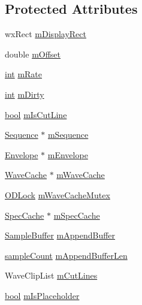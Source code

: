 \subsection*{Protected Attributes}
\begin{DoxyCompactItemize}
\item 
wx\+Rect \hyperlink{class_wave_clip_a53b40f71993f40e4753bfd37a0cd9f9d}{m\+Display\+Rect}
\item 
double \hyperlink{class_wave_clip_ab050845a8220c996af5e8b298e8b2b68}{m\+Offset}
\item 
\hyperlink{xmltok_8h_a5a0d4a5641ce434f1d23533f2b2e6653}{int} \hyperlink{class_wave_clip_a4862030d149b9990fb10891c79953f9e}{m\+Rate}
\item 
\hyperlink{xmltok_8h_a5a0d4a5641ce434f1d23533f2b2e6653}{int} \hyperlink{class_wave_clip_a0e1da41c713ec104dbb33886d2370643}{m\+Dirty}
\item 
\hyperlink{mac_2config_2i386_2lib-src_2libsoxr_2soxr-config_8h_abb452686968e48b67397da5f97445f5b}{bool} \hyperlink{class_wave_clip_a8a0aade8437f6e7400f85b85da659ae5}{m\+Is\+Cut\+Line}
\item 
\hyperlink{class_sequence}{Sequence} $\ast$ \hyperlink{class_wave_clip_a1aab29e1271276ad00a3db2222da37db}{m\+Sequence}
\item 
\hyperlink{class_envelope}{Envelope} $\ast$ \hyperlink{class_wave_clip_a3633c7bbd9fc7f3a9f7cc538b4904e1e}{m\+Envelope}
\item 
\hyperlink{class_wave_cache}{Wave\+Cache} $\ast$ \hyperlink{class_wave_clip_a9ab0ebef5a8cf26be2cac1fdc5fdaea9}{m\+Wave\+Cache}
\item 
\hyperlink{class_o_d_lock}{O\+D\+Lock} \hyperlink{class_wave_clip_ace99287e9c907db79cecfe223f27d470}{m\+Wave\+Cache\+Mutex}
\item 
\hyperlink{class_spec_cache}{Spec\+Cache} $\ast$ \hyperlink{class_wave_clip_a07274cae68c2e916ed206745ea5702a4}{m\+Spec\+Cache}
\item 
\hyperlink{class_sample_buffer}{Sample\+Buffer} \hyperlink{class_wave_clip_a4127ce97a9f9d4eadfbf6d44a9a9f587}{m\+Append\+Buffer}
\item 
\hyperlink{include_2audacity_2_types_8h_afa427e1f521ea5ec12d054e8bd4d0f71}{sample\+Count} \hyperlink{class_wave_clip_a0132009d223a8970aa94b12c5001f595}{m\+Append\+Buffer\+Len}
\item 
Wave\+Clip\+List \hyperlink{class_wave_clip_ae7ad94a38d669ca1a9ce06344a89c8e8}{m\+Cut\+Lines}
\item 
\hyperlink{mac_2config_2i386_2lib-src_2libsoxr_2soxr-config_8h_abb452686968e48b67397da5f97445f5b}{bool} \hyperlink{class_wave_clip_a22bbde01e18a2d12cc0b3cb28c2c4b40}{m\+Is\+Placeholder}
\end{DoxyCompactItemize}


